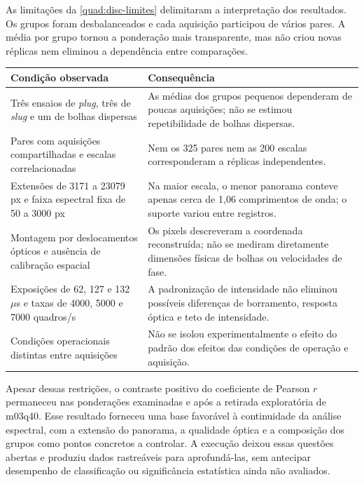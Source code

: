 As limitações da \autoref{quad:disc-limites} delimitaram a interpretação dos
resultados. Os grupos foram desbalanceados e cada aquisição participou de
vários pares. A média por grupo tornou a ponderação mais transparente,
mas não criou novas réplicas nem eliminou a dependência entre comparações.

\begin{quadro}[htbp]
  \centering
  \caption{Limitações observadas e consequências para a interpretação.}
  \label{quad:disc-limites}
  \small
  \begin{tabular}{p{} p{}}
    \hline
    \textbf{Condição observada} & \textbf{Consequência}\\
    \hline
    Três ensaios de \textit{plug}, três de \textit{slug} e um de bolhas dispersas &
    As médias dos grupos pequenos dependeram de poucas aquisições;
    não se estimou repetibilidade de bolhas dispersas.\\
    \hline
    Pares com aquisições compartilhadas e escalas correlacionadas &
    Nem os 325 pares nem as 200 escalas corresponderam a réplicas independentes.\\
    \hline
    Extensões de 3171 a 23079 px e faixa espectral fixa de 50 a 3000 px &
    Na maior escala, o menor panorama conteve apenas cerca de 1,06
    comprimentos de onda; o suporte variou entre registros.\\
    \hline
    Montagem por deslocamentos ópticos e ausência de calibração espacial &
    Os pixels descreveram a coordenada reconstruída; não se mediram
    diretamente dimensões físicas de bolhas ou velocidades de fase.\\
    \hline
    Exposições de 62, 127 e 132 $\mu$s e taxas de 4000, 5000 e 7000 quadros/s &
    A padronização de intensidade não eliminou possíveis diferenças
    de borramento, resposta óptica e teto de intensidade.\\
    \hline
    Condições operacionais distintas entre aquisições &
    Não se isolou experimentalmente o efeito do padrão dos efeitos
    das condições de operação e aquisição.\\
    \hline
  \end{tabular}
\end{quadro}

Apesar dessas restrições, o contraste positivo do coeficiente de Pearson $r$
permaneceu nas ponderações examinadas e após a retirada exploratória de m03q40.
Esse resultado forneceu uma base favorável à continuidade da análise espectral,
com a extensão do panorama, a qualidade óptica e a composição dos grupos como
pontos concretos a controlar. A execução deixou essas questões abertas e
produziu dados rastreáveis para aprofundá-las, sem antecipar desempenho de
classificação ou significância estatística ainda não avaliados.
